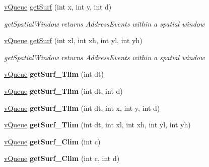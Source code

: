 \begin{DoxyCompactItemize}
\item 
\hyperlink{classev_1_1vQueue}{v\+Queue} \hyperlink{classev_1_1vSurface2_a42f7a69a075225254ffddc7bb5d4d9ba}{get\+Surf} (int x, int y, int d)
\begin{DoxyCompactList}\small\item\em get\+Spatial\+Window returns Address\+Events within a spatial window \end{DoxyCompactList}\item 
\hyperlink{classev_1_1vQueue}{v\+Queue} \hyperlink{classev_1_1vSurface2_aa74adc0c56d62a6f51c2901ec209233e}{get\+Surf} (int xl, int xh, int yl, int yh)
\begin{DoxyCompactList}\small\item\em get\+Spatial\+Window returns Address\+Events within a spatial window \end{DoxyCompactList}\item 
\hyperlink{classev_1_1vQueue}{v\+Queue} {\bfseries get\+Surf\+\_\+\+Tlim} (int dt)\hypertarget{classev_1_1vSurface2_a70e292820956b12c3bc123c4e724e90a}{}\label{classev_1_1vSurface2_a70e292820956b12c3bc123c4e724e90a}

\item 
\hyperlink{classev_1_1vQueue}{v\+Queue} {\bfseries get\+Surf\+\_\+\+Tlim} (int dt, int d)\hypertarget{classev_1_1vSurface2_ad487a13d9bcd8433489fb7e7b3fa5dc8}{}\label{classev_1_1vSurface2_ad487a13d9bcd8433489fb7e7b3fa5dc8}

\item 
\hyperlink{classev_1_1vQueue}{v\+Queue} {\bfseries get\+Surf\+\_\+\+Tlim} (int dt, int x, int y, int d)\hypertarget{classev_1_1vSurface2_a53939fc4b201eaee766114982d0ae9c2}{}\label{classev_1_1vSurface2_a53939fc4b201eaee766114982d0ae9c2}

\item 
\hyperlink{classev_1_1vQueue}{v\+Queue} {\bfseries get\+Surf\+\_\+\+Tlim} (int dt, int xl, int xh, int yl, int yh)\hypertarget{classev_1_1vSurface2_a63c601ec2570dbde037c9ea92342b24b}{}\label{classev_1_1vSurface2_a63c601ec2570dbde037c9ea92342b24b}

\item 
\hyperlink{classev_1_1vQueue}{v\+Queue} {\bfseries get\+Surf\+\_\+\+Clim} (int c)\hypertarget{classev_1_1vSurface2_acb41c1eff67ff285be715f8504d37d22}{}\label{classev_1_1vSurface2_acb41c1eff67ff285be715f8504d37d22}

\item 
\hyperlink{classev_1_1vQueue}{v\+Queue} {\bfseries get\+Surf\+\_\+\+Clim} (int c, int d)\hypertarget{classev_1_1vSurface2_af9e9a30828d508f49921b02224723a36}{}\label{classev_1_1vSurface2_af9e9a30828d508f49921b02224723a36}


\end{DoxyCompactItemize}
